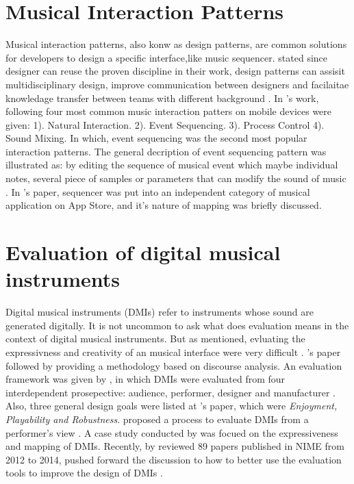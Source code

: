 \section{Musical Interaction Patterns}
Musical interaction patterns, also konw as design patterns, are common solutions for developers to design a specific interface,like music sequencer. \citeauthor{Reference4} stated since designer can reuse the proven discipline in their work, design patterns can assisit multidisciplinary design, improve communication between designers and facilaitae knowledage transfer between teams with different background \citep{Reference4}. In \citeauthor{Reference4}'s work, following four most common music interaction patters on mobile devices were given:
1). Natural Interaction. 2). Event Sequencing. 3). Process Control 4). Sound Mixing.
In which, event sequencing was the second most popular interaction patterns. The general decription of event sequencing pattern was illustrated as: by editing the sequence of musical event which maybe individual notes, several piece of samples or parameters that can modify the sound of music \citep{Reference4}. In \citeauthor{Reference13}'s paper, sequencer was put into an independent category of musical application on App Store, and it's nature of mapping was briefly discussed.


\section{Evaluation of digital musical instruments}

Digital musical instruments (DMIs) refer to instruments whose sound are generated digitally. It is not uncommon to ask what does evaluation means in the context of digital musical instruments. But as \citeauthor{Reference25} mentioned, evluating the expressivness and creativity of an musical interface were very difficult \citep{Reference25}. \citeauthor{Reference25}'s paper followed by providing a methodology based on discourse analysis. An evaluation framework was given by \citeauthor{Reference22}, in which DMIs were evaluated from four interdependent prosepective: audience, performer, designer and manufacturer \citep{Reference22}. Also, three general design goals were listed at \citeauthor{Reference22}'s paper, which were \textit{Enjoyment, Playability and Robustness}. \citeauthor{Reference23} proposed a process to evaluate DMIs from a performer's view \citep{Reference23}. A case study conducted by \citeauthor{Reference24} was focued on the expressiveness and mapping of DMIs. Recently, by reviewed 89 papers published in NIME from 2012 to 2014, \citeauthor{Reference26} pushed forward the discussion to how to better use the evaluation tools to improve the design of DMIs \citep{Reference26}.

\clearpage
